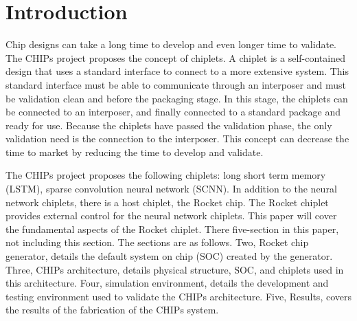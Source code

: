 \documentclass[../main.tex]{subfiles}
\begin{document}
\section{Introduction}
Chip designs can take a long time to develop and even longer time to validate. The CHIPs project proposes the concept of chiplets. A chiplet is a self-contained design that uses a standard interface to connect to a more extensive system. This standard interface must be able to communicate through an interposer and must be validation clean and before the packaging stage. In this stage, the chiplets can be connected to an interposer, and finally connected to a standard package and ready for use. Because the chiplets have passed the validation phase, the only validation need is the connection to the interposer. This concept can decrease the time to market by reducing the time to develop and validate. 

The CHIPs project proposes the following chiplets:  long short term memory (LSTM), sparse convolution neural network (SCNN). In addition to the neural network chiplets, there is a host chiplet, the Rocket chip. The Rocket chiplet provides external control for the neural network chiplets. This paper will cover the fundamental aspects of the Rocket chiplet. There five-section in this paper, not including this section. The sections are as follows. Two, Rocket chip generator, details the default system on chip (SOC) created by the generator. Three, CHIPs architecture, details physical structure, SOC, and chiplets used in this architecture. Four, simulation environment, details the development and testing environment used to validate the CHIPs architecture. Five, Results, covers the results of the fabrication of the CHIPs system.
\end{document}
